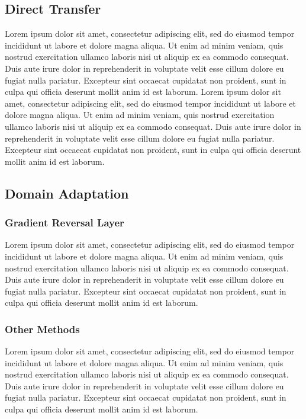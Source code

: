 \documentclass[12pt]{article}
\begin{document}
\subsection{Direct Transfer}
Lorem ipsum dolor sit amet, consectetur adipiscing elit, sed do eiusmod tempor incididunt ut labore et dolore magna aliqua. Ut enim ad minim veniam, quis nostrud exercitation ullamco laboris nisi ut aliquip ex ea commodo consequat. Duis aute irure dolor in reprehenderit in voluptate velit esse cillum dolore eu fugiat nulla pariatur. Excepteur sint occaecat cupidatat non proident, sunt in culpa qui officia deserunt mollit anim id est laborum. Lorem ipsum dolor sit amet, consectetur adipiscing elit, sed do eiusmod tempor incididunt ut labore et dolore magna aliqua. Ut enim ad minim veniam, quis nostrud exercitation ullamco laboris nisi ut aliquip ex ea commodo consequat. Duis aute irure dolor in reprehenderit in voluptate velit esse cillum dolore eu fugiat nulla pariatur. Excepteur sint occaecat cupidatat non proident, sunt in culpa qui officia deserunt mollit anim id est laborum.

\subsection{Domain Adaptation}
\subsubsection{Gradient Reversal Layer}
Lorem ipsum dolor sit amet, consectetur adipiscing elit, sed do eiusmod tempor incididunt ut labore et dolore magna aliqua. Ut enim ad minim veniam, quis nostrud exercitation ullamco laboris nisi ut aliquip ex ea commodo consequat. Duis aute irure dolor in reprehenderit in voluptate velit esse cillum dolore eu fugiat nulla pariatur. Excepteur sint occaecat cupidatat non proident, sunt in culpa qui officia deserunt mollit anim id est laborum.
\subsubsection{Other Methods}
Lorem ipsum dolor sit amet, consectetur adipiscing elit, sed do eiusmod tempor incididunt ut labore et dolore magna aliqua. Ut enim ad minim veniam, quis nostrud exercitation ullamco laboris nisi ut aliquip ex ea commodo consequat. Duis aute irure dolor in reprehenderit in voluptate velit esse cillum dolore eu fugiat nulla pariatur. Excepteur sint occaecat cupidatat non proident, sunt in culpa qui officia deserunt mollit anim id est laborum.
\end{document}
